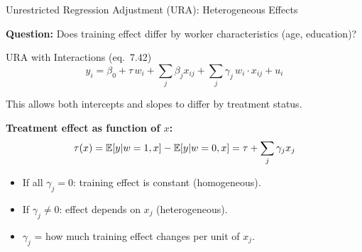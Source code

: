 \documentclass[aspectratio=169, 12pt]{beamer}
\begin{document}
\begin{frame}[shrink=20]{Unrestricted Regression Adjustment (URA): Heterogeneous Effects}

  \textbf{Question:} Does training effect differ by worker characteristics (age, education)?

  \medskip

  \begin{definitionbox}{URA with Interactions (eq.\ 7.42)}
    \[
      y_i = \beta_0 + \tau \, w_i + \sum_j \beta_j x_{ij} + \sum_j \gamma_j \, w_i \cdot x_{ij} + u_i
    \]

    This allows both intercepts and slopes to differ by treatment status.
  \end{definitionbox}

  \medskip

  \textbf{Treatment effect as function of $x$:}
  \[
    \tau(x) = \operatorname{\mathbb{E}}[y | w=1, x] - \operatorname{\mathbb{E}}[y | w=0, x] = \tau + \sum_j \gamma_j x_j
  \]

  \medskip

  \begin{keybox}
    \begin{itemize}
      \item If all $\gamma_j = 0$: training effect is constant (homogeneous).
      \item If $\gamma_j \neq 0$: effect depends on $x_j$ (heterogeneous).
      \item $\gamma_j$ = how much training effect changes per unit of $x_j$.
    \end{itemize}
  \end{keybox}

\end{frame}
\end{document}
